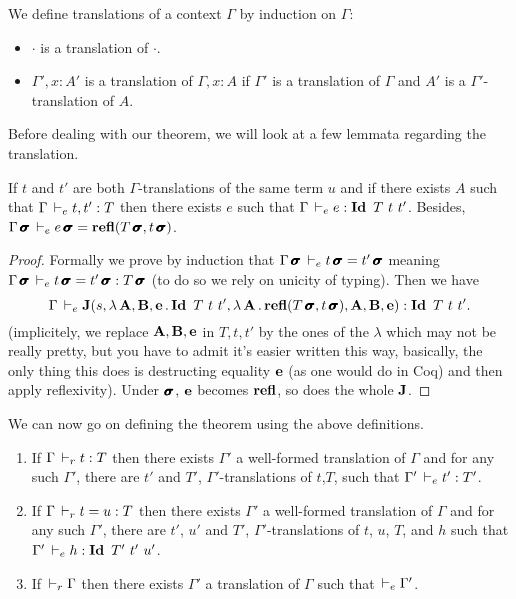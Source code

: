 \documentclass[a4paper,english]{lipics-utf8x}
\begin{document}
  \begin{definition}
    We define translations of a context $\Gamma$ by induction on $\Gamma$:
    \begin{itemize}
      \item $\cdot$ is a translation of $\cdot$.
      \item $\Gamma', x:A'$ is a translation of $\Gamma, x:A$ if $\Gamma'$ is
            a translation of $\Gamma$ and $A'$ is a $\Gamma'$-translation of
            $A$.
    \end{itemize}
  \end{definition}
  Before dealing with our theorem, we will look at a few lemmata regarding the
  translation.

  \begin{lemma}
    \label{lem:transleq}
    If $t$ and $t'$ are both $\Gamma$-translations of the same term $u$ and if
    there exists $A$ such that $\Gamma \,\vdash_e t, t' : T$ then there exists $e$
    such that $\Gamma \dere e : \Id T\ t\ t'$.
    Besides, $\Gamma \operatorname{\pmb{\bm{\sigma}}} \,\vdash_e e \operatorname{\pmb{\bm{\sigma}}} = \operatorname{\mathbf{refl}}(T\operatorname{\pmb{\bm{\sigma}}},t\operatorname{\pmb{\bm{\sigma}}})$.
  \end{lemma}

  \begin{proof}
    Formally we prove by induction that
    $\Gamma \operatorname{\pmb{\bm{\sigma}}} \,\vdash_e t \operatorname{\pmb{\bm{\sigma}}} = t' \operatorname{\pmb{\bm{\sigma}}}$
    meaning $\Gamma \operatorname{\pmb{\bm{\sigma}}} \,\vdash_e t \operatorname{\pmb{\bm{\sigma}}} = t' \operatorname{\pmb{\bm{\sigma}}} : T\operatorname{\pmb{\bm{\sigma}}}$
    (to do so we rely on unicity of typing).
    Then we have
    \[\Gamma \dere \J(s,\lambda \mA, \mB, \me. \Id T\ t\ t',
    \lambda \mA. \refl(T\msigma,t\msigma),\mA,\mB,\me) : \Id T\ t\ t'.\]
    (implicitely, we replace $\operatorname{\mathbf{A}},\operatorname{\mathbf{B}},\operatorname{\mathbf{e}}$ in $T,t,t'$ by the ones of the
    $\lambda$ which may not be really pretty, but you have to admit it's easier
    written this way, basically, the only thing this does is destructing
    equality $\operatorname{\mathbf{e}}$ (as one would do in Coq) and then apply reflexivity).
    Under $\operatorname{\pmb{\bm{\sigma}}}$, $\operatorname{\mathbf{e}}$ becomes $\operatorname{\mathbf{refl}}$, so does the whole $\operatorname{\mathbf{J}}$.
  \end{proof}


  We can now go on defining the theorem using the above definitions.

  \begin{theorem}[Translation]
    \label{thm:transl}
    \leavevmode
    \begin{enumerate}
      \item If $\Gamma \,\vdash_r t : T$ then there exists $\Gamma'$ a well-formed
      translation of $\Gamma$ and for any such $\Gamma'$, there are $t'$ and
      $T'$, $\Gamma'$-translations of $t$,$T$,
      such that $\Gamma' \,\vdash_e t' : T'$.
      \item If $\Gamma \,\vdash_r t = u : T$ then there exists $\Gamma'$ a
      well-formed translation of $\Gamma$ and for any such $\Gamma'$, there are
      $t'$, $u'$ and $T'$, $\Gamma'$-translations of $t$, $u$, $T$, and $h$ such
      that $\Gamma' \dere h : \Id T'\ t'\ u'$.
      \item If $\,\vdash_r \Gamma$ then there exists $\Gamma'$ a translation of
      $\Gamma$ such that $\,\vdash_e \Gamma'$.
    \end{enumerate}
  \end{theorem}
\end{document}

